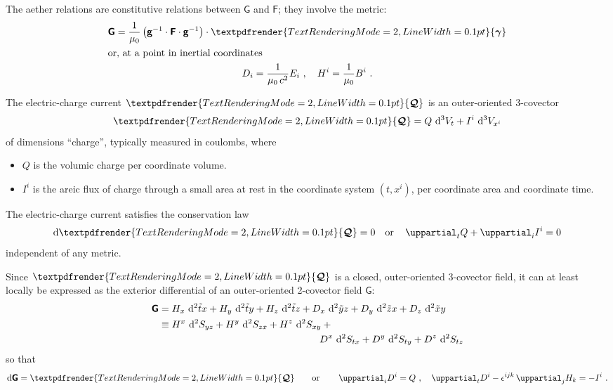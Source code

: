 \documentclass[a4paper,12pt,%
onecolumn,oneside,article,%
british%
]{memoir}
\theoremstyle{remark}
\theoremstyle{innote}
\newcommand*{\mathte}[1]{\bm{\mathsf{#1}}}
\newcommand*{\xbm}[1]{\textpdfrender{TextRenderingMode=2,LineWidth=0.1pt}{\boldsymbol{#1}}}
\newcommand*{\de}{\mathop{}\!\uppartial}%
\newcommand*{\di}{\mathop{}\!\mathrm{d}}%
\renewcommand*{\|}[1][]{\nonscript\:#1\vert\nonscript\:\mathopen{}}
\newcommand*{\ssi}[1]{\di^{2}{#1}}
\newcommand*{\tw}[1]{\tilde{#1}}
\newcommand*{\tti}[1]{\di^{2}S_{#1}}
\newcommand*{\ttti}[1]{\di^{3}V_{#1}}
\newcommand*{\yg}{\mathte{g}}
\newcommand*{\ve}{\xbm{\gamma}}%
\newcommand*{\yQ}{\xbm{\mathcal{Q}}}
\newcommand*{\yF}{\mathte{F}}
\newcommand*{\yG}{\mathte{G}}
\begin{document}
\bigskip

The aether relations are constitutive relations between $\yG$ and $\yF$; they involve the metric:
\begin{gather}
  \label{eq:aether}
  \yG = \frac{1}{\mu_{0}} \,
  \bigl( \yg^{-1} \cdot \yF \cdot \yg^{-1} \bigr) \cdot \ve
  \\
  \shortintertext{or, at a point in inertial coordinates}
  D_{i} = \frac{1}{\mu_{0}\,c^{2}} E_{i} \ ,
  \quad
  H^{i} = \frac{1}{\mu_{0}} B^{i} \ .
\end{gather}

\bigskip

The electric-charge current $\yQ$ is an outer-oriented 3-covector
\begin{equation}
  \label{eq:echarge_current}
  \yQ = Q\,\ttti{t} + I^{i}\,\ttti{x^{i}}
\end{equation}
of dimensions \enquote{charge}, typically measured in coulombs, where
\begin{itemize}
\item $Q$ is the volumic charge per coordinate volume.
\item $I^{i}$ is the areic flux of charge through a small area at rest in the coordinate system $(t, x^{i})$, per coordinate area and coordinate time.
\end{itemize}

The electric-charge current satisfies the conservation law
\begin{equation}
  \label{eq:cons_matter}
  \di\yQ = 0
  \quad\text{or}\quad
  \de_{t}Q + \de_{i} I^{i} = 0
\end{equation}
independent of any metric.

\medskip

Since $\yQ$ is a closed, outer-oriented 3-covector field, it can at least locally be expressed as the exterior differential of an outer-oriented 2-covector field $\yG$:
\begin{equation}
  \label{eq:def_G_em}
  \begin{split}
    \yG &=
    H_{x} \, \ssi{\tw{t}x} + H_{y} \, \ssi{\tw{t}y} + H_{z} \, \ssi{\tw{t}z} +
    D_{x} \, \ssi{\tw{y}z} + D_{y} \, \ssi{\tw{z}x} + D_{z} \, \ssi{\tw{x}y}
    \\
    &
    \begin{multlined}[0.9\linewidth]
      {}\equiv
      H^{x} \, \tti{yz} + H^{y} \, \tti{zx} + H^{z} \, \tti{xy} +{}\\
      D^{x} \, \tti{tx} + D^{y} \, \tti{ty} + D^{z} \, \tti{tz}
    \end{multlined}
  \end{split}
\end{equation}
so that
\begin{equation}
  \label{eq:Q_dG}
  \di\yG = \yQ
  \qquad\text{or}\qquad
  \de_{i} D^{i} = Q \ ,\quad
  \de_{t} D^{i} - \epsilon^{ijk} \de_{j} H_{k} = -I^{i} \ .
\end{equation}
\end{document}
